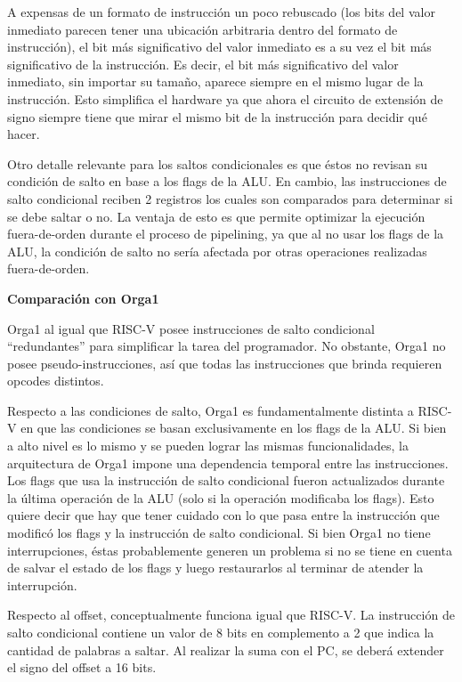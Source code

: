 A expensas de un formato de instrucción un poco rebuscado (los bits del valor inmediato parecen tener una ubicación arbitraria dentro del formato de instrucción), el bit más significativo del valor inmediato es a su vez el bit más significativo de la instrucción. Es decir, el bit más significativo del valor inmediato, sin importar su tamaño, aparece siempre en el mismo lugar de la instrucción. Esto simplifica el hardware ya que ahora el circuito de extensión de signo siempre tiene que mirar el mismo bit de la instrucción para decidir qué hacer.

Otro detalle relevante para los saltos condicionales es que éstos no revisan su condición de salto en base a los flags de la ALU. En cambio, las instrucciones de salto condicional reciben 2 registros los cuales son comparados para determinar si se debe saltar o no. La ventaja de esto es que permite optimizar la ejecución fuera-de-orden durante el proceso de pipelining, ya que al no usar los flags de la ALU, la condición de salto no sería afectada por otras operaciones realizadas fuera-de-orden.

\textbf{Comparación con Orga1}

Orga1 al igual que RISC-V posee instrucciones de salto condicional ``redundantes'' para simplificar la tarea del programador. No obstante, Orga1 no posee pseudo-instrucciones, así que todas las instrucciones que brinda requieren opcodes distintos.

Respecto a las condiciones de salto, Orga1 es fundamentalmente distinta a RISC-V en que las condiciones se basan exclusivamente en los flags de la ALU. Si bien a alto nivel es lo mismo y se pueden lograr las mismas funcionalidades, la arquitectura de Orga1 impone una dependencia temporal entre las instrucciones. Los flags que usa la instrucción de salto condicional fueron actualizados durante la última operación de la ALU (solo si la operación modificaba los flags). Esto quiere decir que hay que tener cuidado con lo que pasa entre la instrucción que modificó los flags y la instrucción de salto condicional. Si bien Orga1 no tiene interrupciones, éstas probablemente generen un problema si no se tiene en cuenta de salvar el estado de los flags y luego restaurarlos al terminar de atender la interrupción.

Respecto al offset, conceptualmente funciona igual que RISC-V. La instrucción de salto condicional contiene un valor de 8 bits en complemento a 2 que indica la cantidad de palabras a saltar. Al realizar la suma con el PC, se deberá extender el signo del offset a 16 bits.
